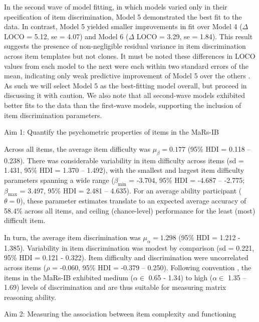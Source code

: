 \documentclass[a4paper,man,natbib]{apa6}
\makeatletter
\renewcommand{\subsubsection}{\@startsection{subsubsection}{3}
  {\z@}%
  {\b@level@two@skip}{\e@level@two@skip}%
  {\normalfont\normalsize\bfseries}}
\makeatother
\begin{document}
In the second wave of model fitting, in which models varied only in their specification of item discrimination, Model 5 demonstrated the best fit to the data. In contrast, Model 5 yielded smaller improvements in fit over Model 4 ($\Delta$ LOCO = 5.12, se = 4.07) and Model 6 ($\Delta$ LOCO = 3.29, se = 1.84). This result suggests the presence of non-negligible residual variance in item discrimination across item templates but not clones. It must be noted these differences in LOCO values from each model to the next were each within two standard errors of the mean, indicating only weak predictive improvement of Model 5 over the others \citep{vehtari2022cv}. As such we will select Model 5 as the best-fitting model overall, but proceed in discussing it with caution. We also note that all second-wave models exhibited better fits to the data than the first-wave models, supporting the inclusion of item discrimination parameters.

\subsubsection{Aim 1: Quantify the psychometric properties of items in the MaRs-IB}

Across all items, the average item difficulty was $\mu_\beta = 0.177$ (95\% HDI = 0.118 -- 0.238). There was considerable variability in item difficulty across items (sd = 1.431, 95\% HDI = 1.370 -- 1.492), with the smallest  and largest item difficulty parameters spanning a wide range ($\beta_{\min}$ = -3.704, 95\% HDI = -4.687 -- -2.775; $\beta_{\max}$ = 3.497, 95\% HDI = 2.481 -- 4.635). For an average ability participant ($\theta = 0$), these parameter estimates translate to an expected average accuracy of 58.4\% across all items, and ceiling (chance-level) performance for the least (most) difficult item.

In turn, the average item discrimination was $\mu_\alpha = 1.298$ (95\% HDI = 1.212 - 1.385). Variability in item discrimination was modest by comparison (sd = 0.221, 95\% HDI = 0.121 - 0.322). Item difficulty and discrimination were uncorrelated across items ($\rho$ = -0.060, 95\% HDI = -0.379 -- 0.250). Following convention \citep{baker2017basics}, the items in the MaRs-IB exhibited medium ($\alpha \in$ 0.65 - 1.34) to high ($\alpha \in$ 1.35 – 1.69) levels of discrimination and are thus suitable for measuring matrix reasoning ability.

\subsubsection{Aim 2: Measuring the association between item complexity and functioning}
\end{document}
